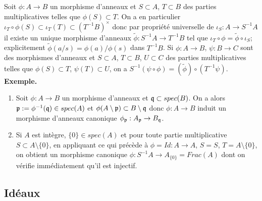 \documentclass[a4paper, 12pt]{amsart}
\begin{document}
 \subsubsection{}\label{LocMorphismes}Soit $\phi:A\rightarrow B$ un morphisme d'anneaux et $S\subset A$, $T\subset B$ des parties multiplicatives telles que $\phi(S)\subset T$. On a en particulier $\iota_T\circ \phi(S)\subset \iota_T(T)\subset (T^{-1}B)^\times$ donc par propriété universelle de $\iota_S:A\rightarrow S^{-1}A$ il existe un unique morphisme d'anneaux $\tilde{\phi}:S^{-1}A\rightarrow T^{-1}B$ tel que $\iota_T\circ \phi=\tilde{\phi}\circ \iota_S$; explicitement $\tilde{\phi}(a/s)=\phi(a)/\phi(s)$ dans $T^{-1}B$. Si $\phi:A\rightarrow B$, $\psi:B\rightarrow C$ sont des morphismes d'anneaux et $S\subset A$, $T\subset B$, $U\subset C$ des parties multiplicatives telles que $\phi(S)\subset T$, $\psi(T)\subset U$, on a $S^{-1}(\psi\circ \phi)=(\tilde{\phi})\circ (T^{-1}\psi)$. \\

\noindent\textbf{Exemple.} 

\begin{enumerate}
\item Soit $\phi:A\rightarrow B$ un morphisme d'anneaux et $\frak{q}\subset spec(B)$. On a alors $\frak{p}:=\phi^{-1}(\frak{q})\in spec(A)$ et $\phi(A\setminus \frak{p})\subset B\setminus \frak{q}$ donc $\phi:A\rightarrow B$ induit un morphisme d'anneaux canonique $\phi_\frak{p}:A_{\frak{p}}\rightarrow B_{\frak{q}}$. 
 \item Si $A$ est intègre,  $\lbrace 0\rbrace\in spec(A)$ et pour toute partie multiplicative $S\subset A\setminus \lbrace 0\rbrace$, en appliquant ce qui précède à $\phi=Id:A\rightarrow A$, $S=S$, $T=A\setminus \lbrace 0\rbrace$, on obtient un morphisme canonique $\phi:S^{-1}A\rightarrow A_{\lbrace 0\rbrace}=Frac(A)$ dont on vérifie immédiatement qu'il est injectif. 
\end{enumerate}
\subsection{Idéaux}\label{LocIdeal} 
\end{document}
